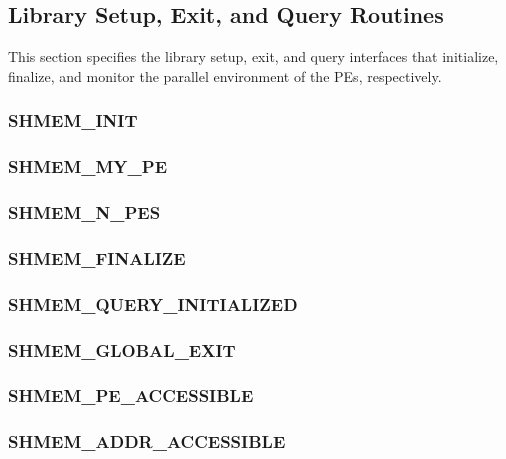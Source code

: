 \documentclass[10pt,oneside]{book}
\begin{document}
\subsection{Library Setup, Exit, and Query Routines}
This section specifies the library setup, exit, and query interfaces that initialize,
finalize, and monitor the parallel environment of the \acp{PE}, respectively.

\subsubsection{\textbf{SHMEM\_INIT}}\label{subsec:shmem_init}


\subsubsection{\textbf{SHMEM\_MY\_PE}}\label{subsec:shmem_my_pe}


\subsubsection{\textbf{SHMEM\_N\_PES}}\label{subsec:shmem_n_pes}


\subsubsection{\textbf{SHMEM\_FINALIZE}}\label{subsec:shmem_finalize}


\subsubsection{\textbf{SHMEM\_QUERY\_INITIALIZED}}
\label{subsec:shmem_query_initialized}


\subsubsection{\textbf{SHMEM\_GLOBAL\_EXIT}}\label{subsec:shmem_global_exit}


\subsubsection{\textbf{SHMEM\_PE\_ACCESSIBLE}}\label{subsec:shmem_pe_accessible}


\subsubsection{\textbf{SHMEM\_ADDR\_ACCESSIBLE}}\label{subsec:shmem_addr_accessible}

\end{document}
